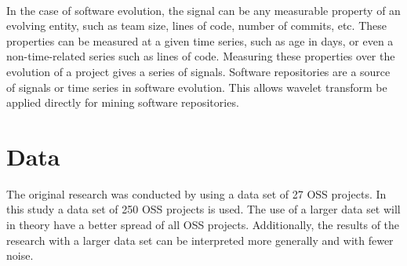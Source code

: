 \paragraph{}
In the case of software evolution, the signal can be any measurable property
of an evolving entity, such as team size, lines of code, number of commits, etc.
These properties can be measured at a given time series, such as age in days,
or even a non-time-related series such as lines of code. Measuring these
properties over the evolution of a project gives a series of signals. Software
repositories are a source of signals or time series in software evolution. This
allows wavelet transform be applied directly for mining software repositories.

\section{Data}
The original research was conducted by using a data set of 27 OSS projects. In
this study a data set of 250 OSS projects is used. The use of a larger data set
will in theory have a better spread of all OSS projects. Additionally, the
results of the research with a larger data set can be interpreted more
generally and with fewer noise.

\begin{comment}
In the original study by Karus it is shown that wavelet analysis can be used to
automatically identify evolutionary events in software development
\cite{karus2013}. He had found that by applying wavelet transformation on time
series, patterns can be found. Amongst different projects, similar patterns were
found. This indicates that these similar patterns could be the result of similar
events in the evolution of these projects.
\end{comment}

\begin{comment}
This section describes the methods used to answer the research questions. A
good structure of this section often follows the sub questions by providing a
method for each.
The research method can be based on the “Scientific method”, but more creative
solutions could be defined as well. In any case, the method needs a thorough
motivation grounded in theory in order to be acceptable.
As part of the method a number of hypotheses are described. These hypotheses
will be tested by the research, using the methods described here.
An important part of this section is validation. How will you evaluate and
validate the outcomes of the research? You can look at Paul Klint’s homepage
for examples of this section as
well\footnote{http://homepages.cwi.nl/~paulk/thesesMasterSoftwareEngineering/2006/RichardKettelerij.pdf}.
\end{comment}